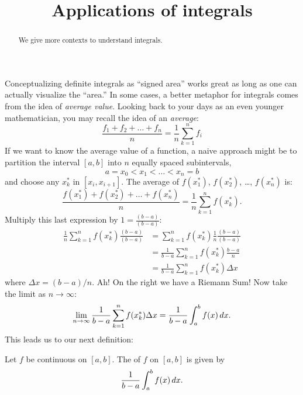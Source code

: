 \documentclass[handout]{ximera}
\title[Dig-In:]{Applications of integrals}
\begin{document}
	\begin{abstract}
		We give more contexts to understand integrals.
	\end{abstract}
	\maketitle
	
	Conceptualizing definite integrals as ``signed area'' works great as
	long as one can actually visualize the ``area.'' In some cases, a
	better metaphor for integrals comes from the idea of \textit{average
		value}.  Looking back to your days as an even younger mathematician,
	you may recall the idea of an \textit{average}:
	\[
	\frac{f_1+f_2+\dots+f_n}{n} = \frac{1}{n}\sum_{k=1}^n f_i
	\]
	If we want to know the average value of a function, a naive approach
	might be to partition the interval $[a,b]$ into $n$ equally spaced
	subintervals, 
	\[
	a=x_0 < x_1 < \dots < x_{n}=b
	\]
	and choose any $x_k^*$ in $[x_i,x_{i+1}]$. The average of $f(x_1^*)$,
	$f(x_2^*)$, \dots, $f(x_n^*)$ is:
	\[
	\frac{f(x_1^*) + f(x_2^*) + \dots + f(x_n^*)}{n} = \frac1n\sum_{k=1}^n f(x_k^*).
	\]
	Multiply this last expression by $1 = \frac{(b-a)}{(b-a)}$:
	\begin{align*}
	\frac1n \sum_{k=1}^n f(x_k^*)\frac{(b-a)}{(b-a)} &= \sum_{k=1}^n f(x_k^*)\frac1n \frac{(b-a)}{(b-a)} \\
	&= \frac{1}{b-a} \sum_{k=1}^n f(x_k^*)\frac{b-a}n  \\
	&=\frac{1}{b-a} \sum_{k=1}^n f(x_k^*)\Delta x
	\end{align*}
	where $\Delta x = (b-a)/n$.  Ah! On the right we have a Riemann Sum!
	Now take the limit as $n\to\infty$:
	\[
	\lim_{n\to\infty} \frac{1}{b-a} \sum_{k=1}^n f(x_k^*)\Delta x = \frac{1}{b-a} \int_a^b f(x)\mathop{}\!d x.
	\]
	This leads us to our next definition:
	
	\begin{definition}
		Let $f$ be continuous on $[a,b]$. The  of $f$ on
		$[a,b]$ is given by
		\[
		\frac{1}{b-a}\int_a^b f(x)\mathop{}\!d x.
		\]
	\end{definition}
	
\end{document}
